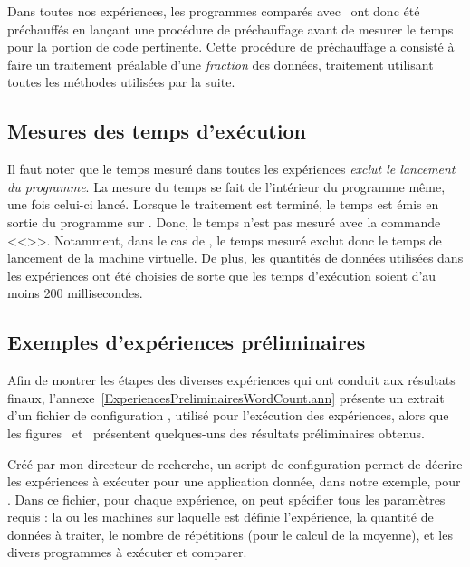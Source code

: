Dans toutes nos exp\'eriences, les programmes  comparés avec \ppff\ ont donc \'et\'e pr\'echauff\'es en lan\c{c}ant une proc\'edure de pr\'echauffage avant de mesurer le temps pour la portion de code pertinente. Cette proc\'edure de pr\'echauffage a consisté à faire un traitement préalable d'une \emph{fraction} des données, traitement utilisant toutes les m\'ethodes utilis\'ees par la suite.

\subsection{Mesures des temps d'exécution}
 
Il faut noter que le temps mesur\'e dans toutes les exp\'eriences \emph{exclut le lancement du programme}. La mesure du temps se fait de l'int\'erieur du programme m\^eme, une fois celui-ci lanc\'e. Lorsque le traitement est termin\'e, le temps est \'emis en sortie du programme sur . Donc, le temps n'est pas mesur\'e avec la commande <<>>. Notamment, dans le cas de , le temps mesuré exclut donc le temps de lancement de la machine virtuelle. De plus, les quantit\'es de donn\'ees utilis\'ees dans les exp\'eriences ont \'et\'e choisies de sorte que les temps d'ex\'ecution soient d'au moins 200 millisecondes.


\subsection{Exemples d'expériences préliminaires}



Afin de montrer les \'etapes des diverses exp\'eriences qui ont conduit aux r\'esultats finaux, l'annexe~\ref{ExperiencesPreliminairesWordCount.ann} pr\'esente un extrait d'un fichier de configuration , utilis\'e pour l'ex\'ecution des expériences, alors que les figures~ et~ présentent quelques-uns des r\'esultats préliminaires obtenus.

Cr\'e\'e par mon directeur de recherche, un script de configuration permet de décrire les expériences \`a ex\'ecuter pour une application donnée, dans notre exemple, pour . Dans ce fichier, pour chaque expérience, on peut sp\'ecifier tous les param\`etres requis : la ou les machines sur laquelle est définie l'expérience, la quantité de donn\'ees à traiter, le nombre de r\'ep\'etitions (pour le calcul de la moyenne), et les divers programmes \`a ex\'ecuter et comparer. 


